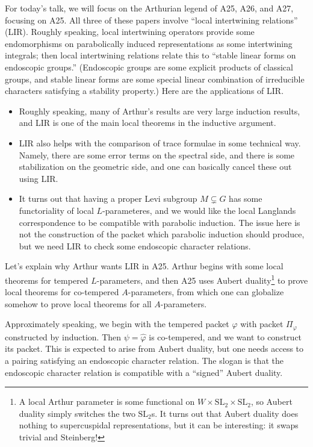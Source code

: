 \documentclass{article}
\begin{document}
For today's talk, we will focus on the Arthurian legend of A25, A26, and A27, focusing on A25. All three of these papers involve ``local intertwining relations'' (LIR). Roughly speaking, local intertwining operators provide some endomorphisms on parabolically induced representations as some intertwining integrals; then local intertwining relations relate this to ``stable linear forms on endoscopic groups.'' (Endoscopic groups are some explicit products of classical groups, and stable linear forms are some special linear combination of irreducible characters satisfying a stability property.) Here are the applications of LIR.
\begin{itemize}
	\item Roughly speaking, many of Arthur's results are very large induction results, and LIR is one of the main local theorems in the inductive argument.
	\item LIR also helps with the comparison of trace formulae in some technical way. Namely, there are some error terms on the spectral side, and there is some stabilization on the geometric side, and one can basically cancel these out using LIR.
	\item It turns out that having a proper Levi subgroup $M\subsetneq G$ has some functoriality of local $L$-parameteres, and we would like the local Langlands correspondence to be compatible with parabolic induction. The issue here is not the construction of the packet which parabolic induction should produce, but we need LIR to check some endoscopic character relations.
\end{itemize}
Let's explain why Arthur wants LIR in A25. Arthur begins with some local theorems for tempered $L$-para\-meters, and then A25 uses Aubert duality\footnote{A local Arthur parameter is some functional on $W\times\mathrm{SL}_2\times\mathrm{SL}_2$, so Aubert duality simply switches the two $\mathrm{SL}_2$s. It turns out that Aubert duality does nothing to supercuspidal representations, but it can be interesting: it swaps trivial and Steinberg!} to prove local theorems for co-tempered $A$-parameters, from which one can globalize somehow to prove local theorems for all $A$-parameters.

Approximately speaking, we begin with the tempered packet $\varphi$ with packet $\Pi_\varphi$ constructed by induction. Then $\psi=\widehat\varphi$ is co-tempered, and we want to construct its packet. This is expected to arise from Aubert duality, but one needs access to a pairing satisfying an endoscopic character relation. The slogan is that the endoscopic character relation is compatible with a ``signed'' Aubert duality.
\end{document}
